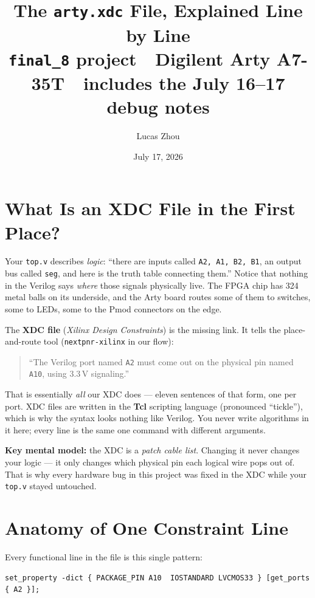\documentclass[11pt]{article}
\title{The \texttt{arty.xdc} File, Explained Line by Line\\
\large \texttt{final\_8} project \,\textperiodcentered\, Digilent Arty A7-35T
\,\textperiodcentered\, includes the July 16--17 debug notes}
\author{Lucas Zhou}
\date{July 17, 2026}
\begin{document}
\maketitle
\tableofcontents
\newpage

\section{What Is an XDC File in the First Place?}

Your \texttt{top.v} describes \emph{logic}: ``there are inputs called
\texttt{A2, A1, B2, B1}, an output bus called \texttt{seg}, and here is the
truth table connecting them.'' Notice that nothing in the Verilog says
\emph{where} those signals physically live. The FPGA chip has 324 metal
balls on its underside, and the Arty board routes some of them to switches,
some to LEDs, some to the Pmod connectors on the edge.

The \textbf{XDC file} (\emph{Xilinx Design Constraints}) is the missing
link. It tells the place-and-route tool (\texttt{nextpnr-xilinx} in our
flow):

\begin{quote}
``The Verilog port named \texttt{A2} must come out on the physical pin
named \texttt{A10}, using 3.3\,V signaling.''
\end{quote}

That is essentially \emph{all} our XDC does --- eleven sentences of that
form, one per port. XDC files are written in the \textbf{Tcl} scripting
language (pronounced ``tickle''), which is why the syntax looks nothing
like Verilog. You never write algorithms in it here; every line is the
same one command with different arguments.

\textbf{Key mental model:} the XDC is a \emph{patch cable list}. Changing
it never changes your logic --- it only changes which physical pin each
logical wire pops out of. That is why every hardware bug in this project
was fixed in the XDC while your \texttt{top.v} stayed untouched.

\section{Anatomy of One Constraint Line}

Every functional line in the file is this single pattern:

\begin{lstlisting}[numbers=none]
set_property -dict { PACKAGE_PIN A10  IOSTANDARD LVCMOS33 } [get_ports { A2 }];
\end{lstlisting}
\end{document}
